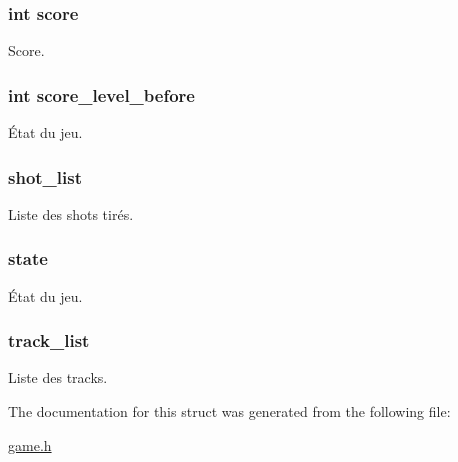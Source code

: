 \subsubsection[{\texorpdfstring{score}{score}}]{\setlength{\rightskip}{0pt plus 5cm}int score}\hypertarget{struct_game_aef160b7437d94056f1dc59646cd5b87d}{}\label{struct_game_aef160b7437d94056f1dc59646cd5b87d}
Score. 
\subsubsection[{\texorpdfstring{score\+\_\+level\+\_\+before}{score_level_before}}]{\setlength{\rightskip}{0pt plus 5cm}int score\+\_\+level\+\_\+before}\hypertarget{struct_game_aa59e6d9166b7c819a741e5738d7edb4a}{}\label{struct_game_aa59e6d9166b7c819a741e5738d7edb4a}
État du jeu. 
\subsubsection[{\texorpdfstring{shot\+\_\+list}{shot_list}}]{ shot\+\_\+list}\hypertarget{struct_game_ad9d344b557c1fa1dcf5707e3009feb07}{}\label{struct_game_ad9d344b557c1fa1dcf5707e3009feb07}
Liste des shots tirés. 
\subsubsection[{\texorpdfstring{state}{state}}]{ state}\hypertarget{struct_game_abe9c6b7e729dc8fdac044b9a37ec19f3}{}\label{struct_game_abe9c6b7e729dc8fdac044b9a37ec19f3}
État du jeu. 
\subsubsection[{\texorpdfstring{track\+\_\+list}{track_list}}]{ track\+\_\+list}\hypertarget{struct_game_a3a80b48316d096cc230b63eb95214c36}{}\label{struct_game_a3a80b48316d096cc230b63eb95214c36}
Liste des tracks. 

The documentation for this struct was generated from the following file\+:\begin{DoxyCompactItemize}
\item 
\hyperlink{game_8h}{game.\+h}\end{DoxyCompactItemize}
